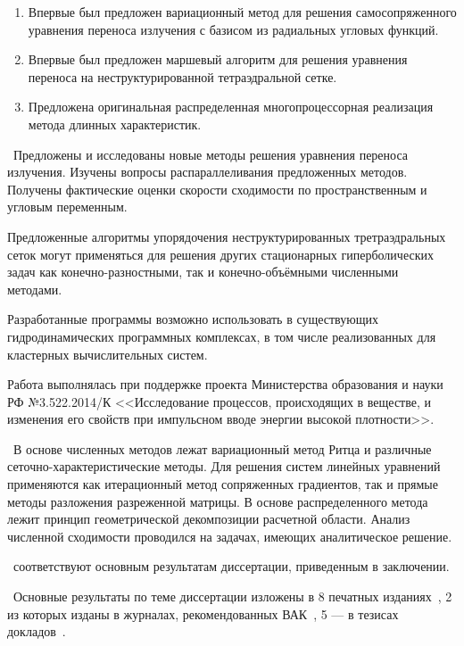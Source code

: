 \novelty
\begin{enumerate}
  \item Впервые был предложен вариационный метод для решения самосопряженного уравнения переноса излучения с базисом из радиальных угловых функций.
  \item Впервые был предложен маршевый алгоритм для решения уравнения переноса на неструктурированной тетраэдральной сетке.
  \item Предложена оригинальная распределенная многопроцессорная реализация метода длинных характеристик.
\end{enumerate}

\influence\ Предложены и исследованы новые методы решения уравнения переноса излучения. Изучены вопросы распараллеливания предложенных методов. Получены фактические оценки скорости сходимости по пространственным и угловым переменным.

Предложенные алгоритмы упорядочения неструктурированных третраэдральных сеток могут применяться для решения других стационарных гиперболических задач как конечно-разностными, так и конечно-объёмными численными методами.

Разработанные программы возможно использовать в существующих гидродинамических программных комплексах, в том числе реализованных для кластерных вычислительных систем.

Работа выполнялась при поддержке проекта Министерства образования и науки РФ №3.522.2014/К <<Исследование процессов, происходящих в веществе, и изменения его свойств при импульсном вводе энергии высокой плотности>>.

\methodology\ В основе численных методов лежат вариационный метод Ритца и различные сеточно-характеристические методы. Для решения систем линейных уравнений применяются как итерационный метод сопряженных градиентов, так и прямые методы разложения разреженной матрицы. 
В основе распределенного метода лежит принцип геометрической декомпозиции расчетной области.
Анализ численной сходимости проводился на задачах, имеющих аналитическое решение.

\ соответствуют основным результатам диссертации, приведенным в заключении.

\probation\ Основные результаты по теме диссертации изложены в 8 печатных изданиях~\cite{skalko2014, tsybulin2015a, tsybulin2015b},
2 из которых изданы в журналах, рекомендованных ВАК~\cite{skalko2014,tsybulin2015a}, 
5 --- в тезисах докладов~\cite{miptconf53,miptconf54,miptconf55,miptconf56,miptconf57}.

